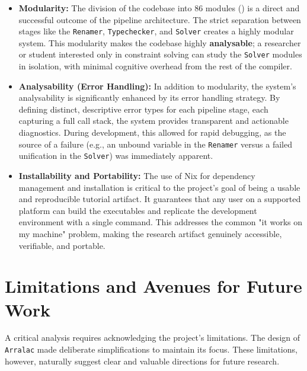 \begin{itemize}
    \item \textbf{Modularity:} The division of the codebase into 86 modules () is a direct and successful outcome of the pipeline architecture. The strict separation between stages like the \texttt{Renamer}, \texttt{Typechecker}, and \texttt{Solver} creates a highly modular system. This modularity makes the codebase highly \textbf{analysable}; a researcher or student interested only in constraint solving can study the \texttt{Solver} modules in isolation, with minimal cognitive overhead from the rest of the compiler.

    \item \textbf{Analysability (Error Handling):} In addition to modularity, the system's analysability is significantly enhanced by its error handling strategy. By defining distinct, descriptive error types for each pipeline stage, each capturing a full call stack, the system provides transparent and actionable diagnostics. During development, this allowed for rapid debugging, as the source of a failure (e.g., an unbound variable in the \texttt{Renamer} versus a failed unification in the \texttt{Solver}) was immediately apparent.

    \item \textbf{Installability and Portability:} The use of Nix for dependency management and installation is critical to the project's goal of being a usable and reproducible tutorial artifact. It guarantees that any user on a supported platform can build the executables and replicate the development environment with a single command. This addresses the common "it works on my machine" problem, making the research artifact genuinely accessible, verifiable, and portable.
\end{itemize}

\section{Limitations and Avenues for Future Work}
\label{sec:Discussion:Limitations}
A critical analysis requires acknowledging the project's limitations. The design of \texttt{Arralac} made deliberate simplifications to maintain its focus. These limitations, however, naturally suggest clear and valuable directions for future research.

